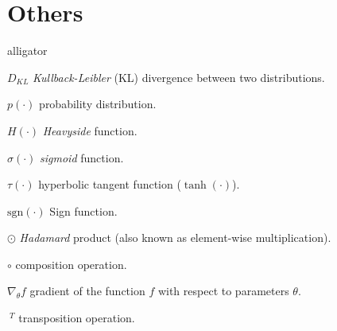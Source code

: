 \section*{Others}
\begin{labeling}{alligator}
	\item [$D_{KL}$]{\textit{Kullback-Leibler} (KL) divergence between two distributions.}
	\item [$p(\cdot)$]{probability distribution.}
	\item [$H(\cdot)$] \textit{Heavyside} function.
	\item [$\sigma(\cdot)$] \textit{sigmoid} function.
	\item [$\tau(\cdot)$] hyperbolic tangent function ($\tanh(\cdot)$).
	\item [$\mathrm{sgn}(\cdot)$] Sign function.
	\item [$\odot$] {\textit{Hadamard} product (also known as element-wise multiplication)}.
	\item [$\circ$] composition operation.
	\item [$\nabla_\theta f$] gradient of the function $f$ with respect to parameters $\theta$.
	\item [$\ ^T$] transposition operation.

\end{labeling}